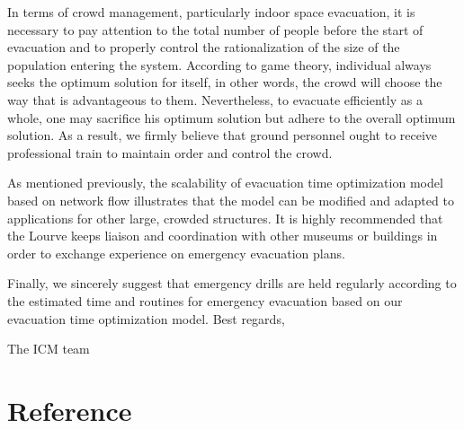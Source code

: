 \documentclass{mcmthesis}
\begin{document}
	In terms of crowd management,  particularly indoor space evacuation, it is necessary to pay attention to the total number of people before the start of evacuation and to properly control the rationalization of the size of the population entering the system. According to game theory, individual always seeks the optimum solution for itself, in other words, the crowd will choose the way that is advantageous to them. Nevertheless, to evacuate efficiently as a whole, one may sacrifice his optimum solution but adhere to the overall optimum solution. As a result, we firmly believe that ground personnel ought to receive professional train to maintain order and control the crowd.
	
	As mentioned previously, the scalability of evacuation time optimization model based on network flow illustrates that the model can be modified and adapted to applications for other large, crowded structures. It is highly recommended that the Lourve keeps liaison and coordination with other museums or buildings in order to exchange experience on emergency evacuation plans. 
	
	Finally, we sincerely suggest that emergency drills are held regularly according to the estimated time and routines for emergency evacuation based on our evacuation time optimization model.
	Best regards,
	
	The ICM team
	
	
	\section{Reference}
	
	
	
\end{document}
